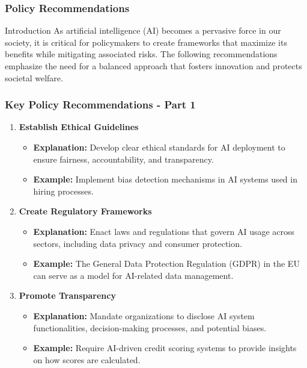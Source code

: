 \documentclass[aspectratio=169]{beamer}
\begin{document}
\begin{frame}[fragile]
    \frametitle{Policy Recommendations}
    
    \begin{block}{Introduction}
        As artificial intelligence (AI) becomes a pervasive force in our society, it is critical for policymakers to create frameworks that maximize its benefits while mitigating associated risks. The following recommendations emphasize the need for a balanced approach that fosters innovation and protects societal welfare.
    \end{block}
\end{frame}

\begin{frame}[fragile]
    \frametitle{Key Policy Recommendations - Part 1}

    \begin{enumerate}
        \item \textbf{Establish Ethical Guidelines}
        \begin{itemize}
            \item \textbf{Explanation:} Develop clear ethical standards for AI deployment to ensure fairness, accountability, and transparency.
            \item \textbf{Example:} Implement bias detection mechanisms in AI systems used in hiring processes.
        \end{itemize}

        \item \textbf{Create Regulatory Frameworks}
        \begin{itemize}
            \item \textbf{Explanation:} Enact laws and regulations that govern AI usage across sectors, including data privacy and consumer protection.
            \item \textbf{Example:} The General Data Protection Regulation (GDPR) in the EU can serve as a model for AI-related data management.
        \end{itemize}

        \item \textbf{Promote Transparency}
        \begin{itemize}
            \item \textbf{Explanation:} Mandate organizations to disclose AI system functionalities, decision-making processes, and potential biases.
            \item \textbf{Example:} Require AI-driven credit scoring systems to provide insights on how scores are calculated.
        \end{itemize}
    \end{enumerate}
\end{frame}
\end{document}
